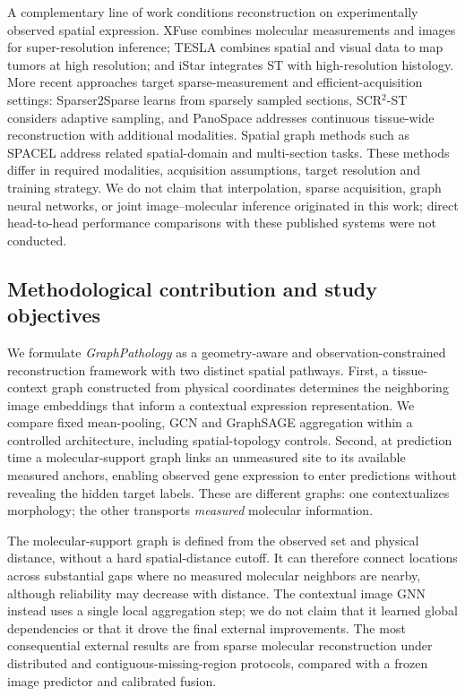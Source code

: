 A complementary line of work conditions reconstruction on experimentally observed spatial expression. XFuse combines molecular measurements and images for super-resolution inference\cite{bergenstrahle2022}; TESLA combines spatial and visual data to map tumors at high resolution\cite{tesla2023}; and iStar integrates ST with high-resolution histology\cite{istar2024}. More recent approaches target sparse-measurement and efficient-acquisition settings: Sparser2Sparse learns from sparsely sampled sections\cite{sparser2026}, SCR$^2$-ST considers adaptive sampling\cite{scr2st2026}, and PanoSpace addresses continuous tissue-wide reconstruction with additional modalities\cite{panospace2026}. Spatial graph methods such as SPACEL address related spatial-domain and multi-section tasks\cite{spacel2023}. These methods differ in required modalities, acquisition assumptions, target resolution and training strategy. We do not claim that interpolation, sparse acquisition, graph neural networks, or joint image--molecular inference originated in this work; direct head-to-head performance comparisons with these published systems were not conducted.

\subsection{Methodological contribution and study objectives}
We formulate \emph{GraphPathology} as a geometry-aware and observation-constrained reconstruction framework with two distinct spatial pathways. First, a tissue-context graph constructed from physical coordinates determines the neighboring image embeddings that inform a contextual expression representation. We compare fixed mean-pooling, GCN\cite{kipf2017} and GraphSAGE\cite{hamilton2017} aggregation within a controlled architecture, including spatial-topology controls. Second, at prediction time a molecular-support graph links an unmeasured site to its available measured anchors, enabling observed gene expression to enter predictions without revealing the hidden target labels. These are different graphs: one contextualizes morphology; the other transports \emph{measured} molecular information.

The molecular-support graph is defined from the observed set and physical distance, without a hard spatial-distance cutoff. It can therefore connect locations across substantial gaps where no measured molecular neighbors are nearby, although reliability may decrease with distance. The contextual image GNN instead uses a single local aggregation step; we do not claim that it learned global dependencies or that it drove the final external improvements. The most consequential external results are from sparse molecular reconstruction under distributed and contiguous-missing-region protocols, compared with a frozen image predictor and calibrated fusion.

